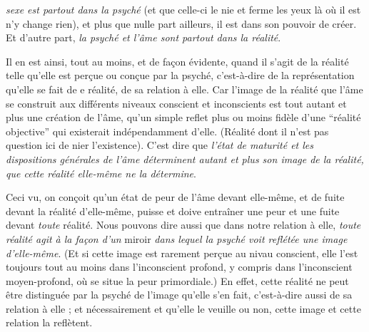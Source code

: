 

\textit{sexe est partout dans la psyché} (et que celle-ci le nie et ferme les yeux là où il est n'y change rien), et plus que nulle part ailleurs, il est dans son pouvoir de créer. Et d'autre part, \textit{la psyché et l'âme sont partout dans la réalité}.

Il en est ainsi, tout au moins, et de façon évidente, quand il s'agit de la réalité telle qu'elle est perçue ou conçue par la psyché, c'est-à-dire de la représentation qu'elle se fait de \margin{\handwritten{$\bullet$}}e réalité, de sa relation à elle. Car l'image de la réalité que l'âme se construit aux différents niveaux conscient et inconscients est tout autant et plus une création de l'âme, qu'un simple reflet plus ou moins fidèle d'une ``réalité objective'' qui existerait indépendamment d'elle. (Réalité dont il n'est pas question ici de nier l'existence). C'est dire que \textit{l'état de maturité et les dispositions générales de l'âme déterminent autant et plus son image de la réalité, que cette réalité elle-même ne la détermine}.

Ceci vu, on conçoit qu'un état de peur de l'âme devant elle-même, et de fuite devant la réalité d'elle-même, puisse et doive entraîner une peur et une fuite devant \textit{toute} réalité. Nous pouvons dire aussi que dans notre relation à elle, \textit{toute réalité agit à la façon d'un} miroir \textit{dans lequel la psyché voit reflétée une image d'elle-même}. (Et si cette image est rarement perçue au \margin{\handwritten{$\bullet$}}nivau conscient, elle l'est toujours tout au moins dans l'inconscient profond, y compris dans l'inconscient moyen-profond, où se situe la peur primordiale.) En effet, cette réalité ne peut être distinguée par la psyché de l'image qu'elle s'en fait, c'est-à-dire aussi de sa relation à elle ; et nécessairement et qu'elle le veuille ou non, cette image et cette relation la reflètent.


